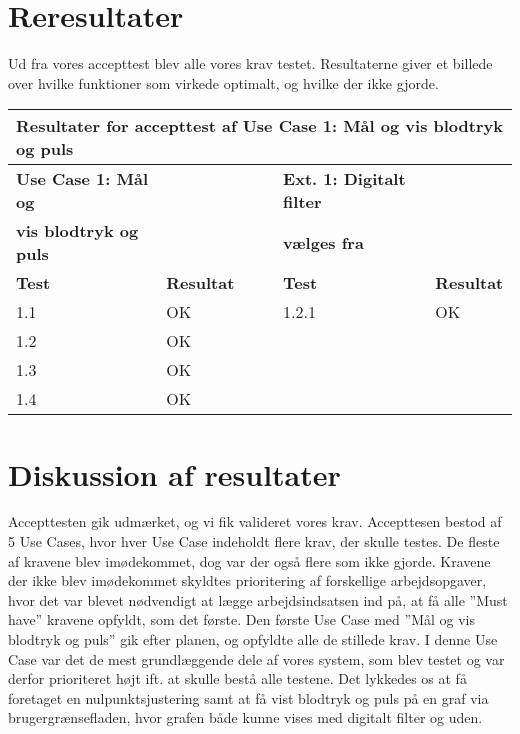 \section{Reresultater}

Ud fra vores accepttest blev alle vores krav testet. Resultaterne giver et billede over hvilke funktioner som virkede optimalt, og hvilke der ikke gjorde. 

\begin{table}[h!]
	\centering
	\begin{tabular}{llllll}
		\multicolumn{6}{l}{\cellcolor[HTML]{187ABD}\textbf{Resultater for accepttest af Use Case 1: Mål og vis blodtryk og puls}} \\ \hline
		\textbf{Use Case 1: Mål og} & \multicolumn{1}{l|}{} &  & \multicolumn{1}{l|}{} & \textbf{Ext. 1: Digitalt filter} &  \\
		\textbf{vis blodtryk og puls} & \multicolumn{1}{l|}{} &  & \multicolumn{1}{l|}{} & \textbf{vælges fra} &  \\ \cline{1-2} \cline{5-6} 
		\textbf{Test} & \multicolumn{1}{l|}{\textbf{Resultat}} &  & \multicolumn{1}{l|}{} & \textbf{Test} & \textbf{Resultat} \\ \cline{1-2} \cline{5-6} 
		1.1 & \multicolumn{1}{l|}{OK} &  & \multicolumn{1}{l|}{} & 1.2.1 & OK \\ \cline{1-2} \cline{5-6} 
		1.2 & \multicolumn{1}{l|}{OK} &  & \multicolumn{1}{l|}{} &  &  \\ \cline{1-2} \cline{5-6} 
		1.3 & \multicolumn{1}{l|}{OK} &  & \multicolumn{1}{l|}{} &  &  \\ \cline{1-2} \cline{5-6} 
		1.4 & \multicolumn{1}{l|}{OK} &  & \multicolumn{1}{l|}{} &  & 
	\end{tabular}
\end{table}

\section{Diskussion af resultater}

Accepttesten gik udmærket, og vi fik valideret vores krav. Accepttesen bestod af 5 Use Cases, hvor hver Use Case indeholdt flere krav, der skulle testes. De fleste af kravene blev imødekommet, dog var der også flere som ikke gjorde. Kravene der ikke blev imødekommet skyldtes prioritering af forskellige arbejdsopgaver, hvor det var blevet nødvendigt at lægge arbejdsindsatsen ind på, at få alle ”Must have” kravene opfyldt, som det første.
Den første Use Case med ”Mål og vis blodtryk og puls” gik efter planen, og opfyldte alle de stillede krav. I denne Use Case var det de mest grundlæggende dele af vores system, som blev testet og var derfor prioriteret højt ift. at skulle bestå alle testene. Det lykkedes os at få foretaget en nulpunktsjustering samt at få vist blodtryk og puls på en graf via brugergrænsefladen, hvor grafen både kunne vises med digitalt filter og uden. 

